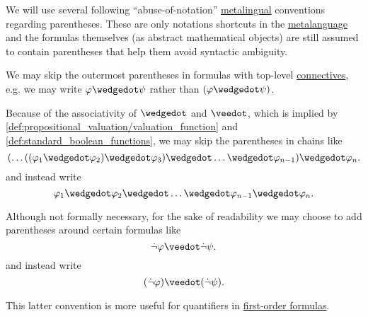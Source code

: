 \begin{remark}\label{rem:propositional_formula_parentheses}
  We will use several following \enquote{abuse-of-notation} \hyperref[con:metalogic]{metalingual} conventions regarding parentheses. These are only notations shortcuts in the \hyperref[con:metalogic]{metalanguage} and the formulas themselves (as abstract mathematical objects) are still assumed to contain parentheses that help them avoid syntactic ambiguity.

  \begin{thmenum}
     We may skip the outermost parentheses in formulas with top-level \hyperref[def:propositional_alphabet/connectives]{connectives}, e.g. we may write \( \varphi \synwedge \psi \) rather than \( (\varphi \synwedge \psi) \).

     Because of the associativity of \( \synwedge \) and \( \synvee \), which is implied by \cref{def:propositional_valuation/valuation_function} and \cref{def:standard_boolean_functions}, we may skip the parentheses in chains like
    \begin{equation*}
      ( \ldots ((\varphi_1 \synwedge \varphi_2) \synwedge \varphi_3) \synwedge \ldots \synwedge \varphi_{n-1} ) \synwedge \varphi_n.
    \end{equation*}
    and instead write
    \begin{equation*}
      \varphi_1 \synwedge \varphi_2 \synwedge \ldots \synwedge \varphi_{n-1} \synwedge \varphi_n.
    \end{equation*}

     Although not formally necessary, for the sake of readability we may choose to add parentheses around certain formulas like
    \begin{equation*}
      \synneg \varphi \synvee \synneg \psi.
    \end{equation*}
    and instead write
    \begin{equation*}
      (\synneg \varphi) \synvee (\synneg \psi).
    \end{equation*}

    This latter convention is more useful for quantifiers in \hyperref[def:first_order_syntax/formula]{first-order formulas}.
  \end{thmenum}
\end{remark}

